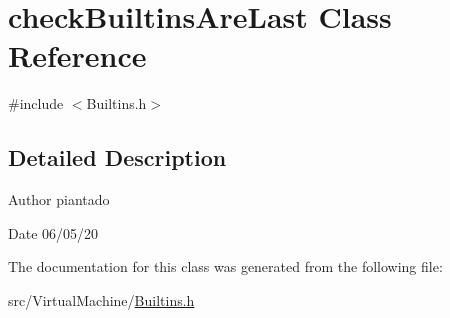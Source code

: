 \hypertarget{classcheck_builtins_are_last}{}\section{check\+Builtins\+Are\+Last Class Reference}
\label{classcheck_builtins_are_last}


{\ttfamily \#include $<$Builtins.\+h$>$}



\subsection{Detailed Description}
\begin{DoxyAuthor}{Author}
piantado 
\end{DoxyAuthor}
\begin{DoxyDate}{Date}
06/05/20 
\end{DoxyDate}


The documentation for this class was generated from the following file\+:\begin{DoxyCompactItemize}
\item 
src/\+Virtual\+Machine/\hyperlink{_builtins_8h}{Builtins.\+h}\end{DoxyCompactItemize}
